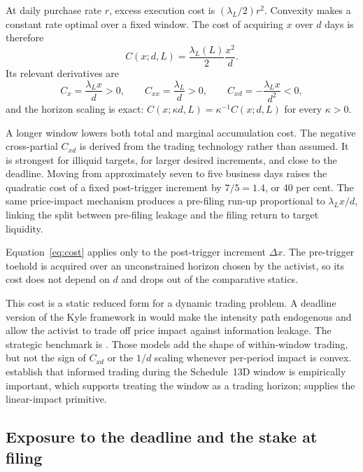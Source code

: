 At daily purchase rate $r$, excess execution cost is
$(\lambda_L/2)r^2$. Convexity makes a constant rate optimal over a fixed window.
The cost of acquiring $x$ over $d$ days is therefore
\begin{equation}
C(x;d,L)=\frac{\lambda_L(L)}{2}\frac{x^2}{d}.
\label{eq:cost}
\end{equation}
Its relevant derivatives are
\begin{equation}
C_x=\frac{\lambda_Lx}{d}>0,\qquad
C_{xx}=\frac{\lambda_L}{d}>0,\qquad
C_{xd}=-\frac{\lambda_Lx}{d^2}<0,
\label{eq:cost-derivs}
\end{equation}
and the horizon scaling is exact:
$C(x;\kappa d,L)=\kappa^{-1}C(x;d,L)$ for every $\kappa>0$.

A longer window lowers both total and marginal accumulation cost. The negative
cross-partial $C_{xd}$ is derived from the trading technology rather than
assumed. It is strongest for illiquid targets, for larger desired increments,
and close to the deadline. Moving from approximately seven to five business
days raises the quadratic cost of a fixed post-trigger increment by
$7/5=1.4$, or 40 per cent. The same price-impact mechanism produces a
pre-filing run-up proportional to $\lambda_Lx/d$, linking the split between
pre-filing leakage and the filing return to target liquidity.

Equation~\eqref{eq:cost} applies only to the post-trigger increment $\Delta x$.
The pre-trigger toehold is acquired over an unconstrained horizon chosen by the
activist, so its cost does not depend on $d$ and drops out of the comparative
statics.

This cost is a static reduced form for a dynamic trading problem. A deadline
version of the Kyle framework in \textcite{collindufresnefos2016} would make the
intensity path endogenous and allow the activist to trade off price impact
against information leakage. The strategic benchmark is \textcite{back2018}.
Those models add the shape of within-window trading, but not the sign of
$C_{xd}$ or the $1/d$ scaling whenever per-period impact is convex.
\textcite{collindufresnefos2015} establish that informed trading during the
Schedule~13D window is empirically important, which supports treating the
window as a trading horizon; \textcite{kyle1985} supplies the linear-impact
primitive.

\subsection{Exposure to the deadline and the stake at filing}
\label{sec:model-corner}

